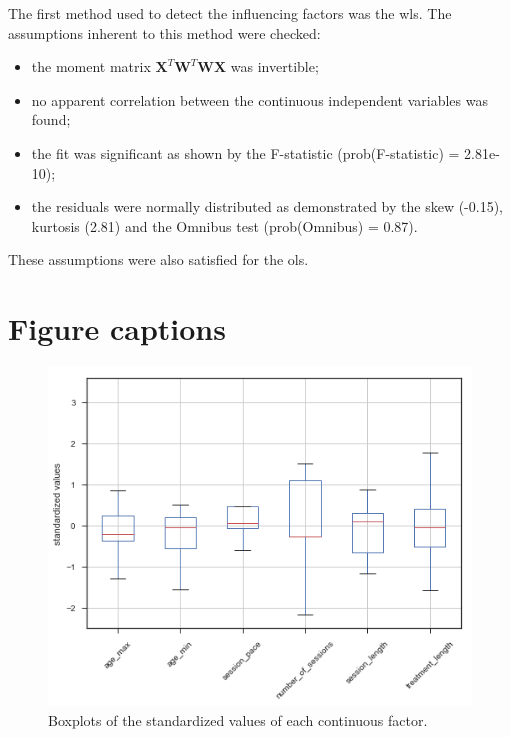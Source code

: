 \documentclass[12pt,a4paper,english]{article}
\begin{document}
The first method used to detect the influencing factors was the \gls{wls}. The assumptions inherent to this method were checked: 
\begin{itemize}
	\item the moment matrix ${\textbf{X}}^{T}\textbf{W}^{T}\textbf{WX}$ was invertible;
  \item no apparent correlation between the continuous independent variables was found; 
  \item the fit was significant as shown by the F-statistic (prob(F-statistic) = 2.81e-10); 
  \item the residuals were normally distributed as demonstrated by the skew (-0.15), kurtosis (2.81) and the Omnibus test (prob(Omnibus) = 0.87).
\end{itemize} 

These assumptions were also satisfied for the \gls{ols}.

\clearpage



\clearpage

\section{Figure captions}

\begin{figure}[h!]
	\center
  \includegraphics[scale=0.5]{figures/factors_analysis_boxplot_no_colors_no_two_columns.png}
  \caption{Boxplots of the standardized values of each continuous factor.}
  \label{Figure:factors_analysis_boxplots}
\end{figure}
\end{document}
